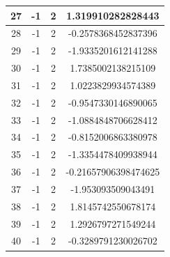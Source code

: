 \documentclass[]{article}
\begin{document}
\begin{table}[!h]
\begin{tabular}{|c|c|c|c|}
			27 & -1 &	 2 &	 1.319910282828443 \\ \hline
			28 & -1 &	 2 &	 -0.2578368452837396 \\ \hline
			29 & -1 &	 2 &	 -1.9335201612141288 \\ \hline
			30 & -1 &	 2 &	 1.7385002138215109 \\ \hline
			31 & -1 &	 2 &	 1.0223829934574389 \\ \hline
			32 & -1 &	 2 &	 -0.9547330146890065 \\ \hline
			33 & -1 &	 2 &	 -1.0884848706628412 \\ \hline
			34 & -1 &	 2 &	 -0.8152006863380978 \\ \hline
			35 & -1 &	 2 &	 -1.3354478409938944 \\ \hline
			36 & -1 &	 2 &	 -0.21657906398474625 \\ \hline
			37 & -1 &	 2 &	 -1.953093509043491 \\ \hline
			38 & -1 &	 2 &	 1.8145742550678174 \\ \hline
			39 & -1 &	 2 &	 1.2926797271549244 \\ \hline
			40 & -1 &	 2 &	 -0.3289791230026702 \\ \hline
		\end{tabular}
	\end{table}
\end{document}
